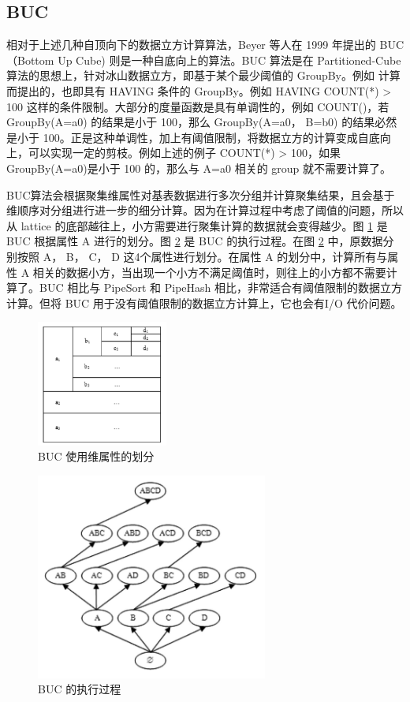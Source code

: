 \subsection{BUC}

相对于上述几种自顶向下的数据立方计算算法，Beyer 等人在 1999 年提出的 BUC （Bottom Up Cube) 则是一种自底向上的算法。BUC 算法是在 Partitioned-Cube 算法的思想上，针对冰山数据立方，即基于某个最少阈值的 GroupBy。例如 计算而提出的，也即具有 HAVING 条件的 GroupBy。例如 HAVING COUNT(*) > 100 这样的条件限制。大部分的度量函数是具有单调性的，例如 COUNT()，若 GroupBy(A=a0) 的结果是小于 100，那么 GroupBy(A=a0， B=b0) 的结果必然是小于 100。正是这种单调性，加上有阈值限制，将数据立方的计算变成自底向上，可以实现一定的剪枝。例如上述的例子 COUNT(*) > 100，如果 GroupBy(A=a0)是小于 100 的，那么与 A=a0 相关的 group 就不需要计算了。

BUC算法会根据聚集维属性对基表数据进行多次分组并计算聚集结果，且会基于维顺序对分组进行进一步的细分计算。因为在计算过程中考虑了阈值的问题，所以从 lattice 的底部越往上，小方需要进行聚集计算的数据就会变得越少。图 \ref{BUC_partition} 是 BUC 根据属性 A 进行的划分。图 \ref{BUC_execution} 是 BUC 的执行过程。在图 \ref{BUC_execution} 中，原数据分别按照 A， B， C， D 这4个属性进行划分。在属性 A 的划分中，计算所有与属性 A 相关的数据小方，当出现一个小方不满足阈值时，则往上的小方都不需要计算了。BUC 相比与 PipeSort 和 PipeHash 相比，非常适合有阈值限制的数据立方计算。但将 BUC 用于没有阈值限制的数据立方计算上，它也会有I/O 代价问题。

\begin{figure}[!htb]
\centering\includegraphics[width=1.7in]{picture/ch_current_research/BUC_partition} 
\caption{BUC 使用维属性的划分}\label{BUC_partition} 
\end{figure} 


\begin{figure}[!htb]
\centering\includegraphics[width=3in]{picture/ch_current_research/BUC_execution} 
\caption{BUC 的执行过程}\label{BUC_execution} 
\end{figure} 


